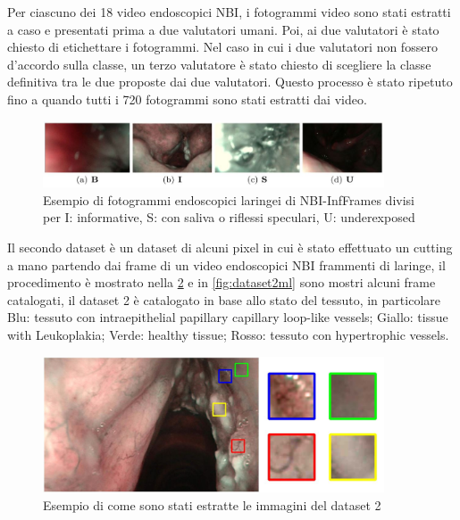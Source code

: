 Per ciascuno dei 18 video endoscopici NBI, i fotogrammi video sono stati estratti a caso e
presentati prima a due valutatori umani. Poi, ai due valutatori è stato chiesto di etichettare i fotogrammi. Nel caso in cui i due
valutatori non fossero d'accordo sulla classe, un terzo valutatore è stato
chiesto di scegliere la classe definitiva tra le due proposte
dai due valutatori. Questo processo è stato ripetuto fino a quando tutti i
720 fotogrammi sono stati estratti dai video.

\begin{figure}[ht]
    \centering
    \includegraphics[width=0.9\textwidth]{introduzione/Larynge.jpg}
    \caption{Esempio di fotogrammi endoscopici laringei di NBI-InfFrames divisi per I: informative, S: con
    saliva o riflessi speculari,
    U: underexposed}
    \label{fig:larynges}
\end{figure}

Il secondo dataset è un dataset di alcuni pixel in cui è stato effettuato un cutting a mano partendo dai frame di  un video endoscopici NBI frammenti di laringe, il procedimento è mostrato nella \cref{fig:dataset2}  e in \cref{fig:dataset2ml} sono mostri alcuni frame catalogati, il dataset 2 è catalogato in base allo stato del tessuto, in particolare Blu: tessuto con intraepithelial papillary capillary loop-like vessels; Giallo: tissue with Leukoplakia;
Verde: healthy tissue; Rosso: tessuto con hypertrophic vessels\cite{moccia_larynge}.

\begin{figure}[ht]
    \centering
    \includegraphics[width=0.9\textwidth]{introduzione/dataset-2.JPG}
    \caption{Esempio di come sono stati estratte le immagini del dataset 2}
    \label{fig:dataset2}
\end{figure}

